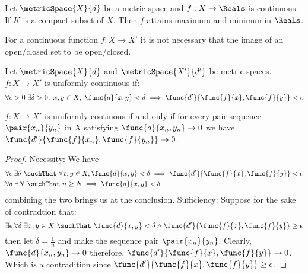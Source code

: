 \begin{corollary}
    Let \(\metricSpace{X}{d}\) be a metric space and \(f : X \to \Reals\) is continuous. If \(K\) is a compact subset of \(X\). Then \(f\) attains maximum and minimun in \(\Reals\).
\end{corollary}

\begin{note}
    For a continuous function \(f : X \to X'\) it is not necessary that the image of an open/closed set to be open/closed.
\end{note}

\begin{definition} 
    Let \(\metricSpace{X}{d}\) and \(\metricSpace{X'}{d'}\) be metric spaces.  \(f :X \to X'\) is uniformly continuous if:
    \[ \forall \epsilon > 0\; \exists \delta > 0, \; x,y \in X, \; \func{d}{x,y} < \delta \implies \func{d'}{\func{f}{x},\func{f}{y}} < \epsilon\]
\end{definition}

\begin{proposition}
    \(f: X \to X'\) is uniformly continous if and only if for every pair sequence \(\pair{x_n}{y_n}\) in \(X\) satisfying \(\func{d}{x_n,y_n} \to 0\) we have \(\func{d'}{\func{f}{x_n}, \func{f}{y_n}} \to 0\).
\end{proposition}

\begin{proof}
    Necessity: We have
    \begin{align*}
         & \forall \epsilon \; \exists \delta \  \suchThat \ \forall x,y \in X, \func{d}{x,y} < \delta \implies \func{d'}{\func{f}{x}, \func{f}{y}} < \epsilon \\
         & \forall \delta \; \exists N \ \suchThat \ n \geq N \implies \func{d}{x,y} < \delta
    \end{align*}
    combining the two brings us at the conclusion.
    Sufficiency: Suppose for the sake of contradtion that:
    \begin{equation*}
        \exists \epsilon \; \forall \delta \; \exists x,y \in X  \ \suchThat \ \func{d}{x,y} < \delta \land \func{d'}{\func{f}{x}, \func{f}{y}} \geq \epsilon
    \end{equation*}
    then let \(\delta = \frac{1}{n}\) and make the sequence pair \(\pair{x_n}{y_n}\). Clearly, \(\func{d}{x_n,y_n} \to 0\) therefore, \(\func{d'}{\func{f}{x}, \func{f}{y}} \to 0\). Which is a contradition since \(\func{d'}{\func{f}{x}, \func{f}{y}} \geq \epsilon \).
\end{proof}

